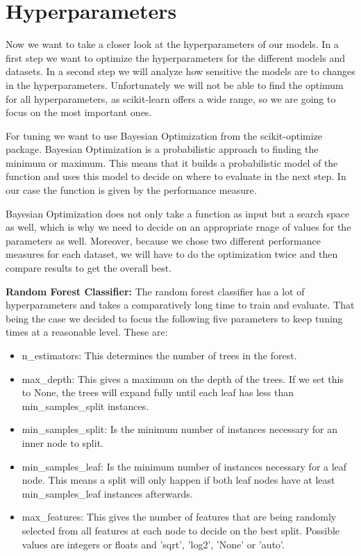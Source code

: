 \documentclass[a4paper,10pt]{article}
\begin{document}
\section{Hyperparameters}
\label{sec:hyperparameters}
Now we want to take a closer look at the hyperparameters of our models. In a first step we want to optimize the hyperparameters for the different models and datasets.
In a second step we will analyze how sensitive the models are to changes in the hyperparameters. Unfortunately we will not be able to find the optimum for all hyperparameters, as scikit-learn offers a wide range, so we are going to focus on the most important ones.

For tuning we want to use Bayesian Optimization from the scikit-optimize package. Bayesian Optimization is a probabilistic approach to finding the minimum or maximum. This means that it builds a probabilistic model of the function and uses this model to decide on where to evaluate in the next step. In our case the function is given by the performance measure. 

Bayesian Optimization does not only take a function as input but a search space as well, which is why we need to decide on an appropriate rnage of values for the parameters as well. Moreover, because we chose two different performance measures for each dataset, we will have to do the optimization twice and then compare results to get the overall best.

\textbf{Random Forest Classifier:} The random forest classifier has a lot of hyperparameters and takes a comparatively long time to train and evaluate. That being the case we decided to focus the following five parameters to keep tuning times at a reasonable level. These are:

\begin{itemize}
    \item \textsf{n\_estimators}: This determines the number of trees in the forest.
\item \textsf{max\_depth}: This gives a maximum on the depth of the trees. If we set this to None, the trees will expand fully until each leaf has less than \textsf{min\_samples\_split} instances.
\item \textsf{min\_samples\_split}: Is the minimum number of instances necessary for an inner node to split.
\item \textsf{min\_samples\_leaf}: Is the minimum number of instances necessary for a leaf node. This means a split will only happen if both leaf nodes have at least \textsf{min\_samples\_leaf} instances afterwards.
\item \textsf{max\_features}: This gives the number of features that are being randomly selected from all features at each node to decide on the best split. Possible values are integers or floats and 'sqrt', 'log2', 'None' or 'auto'.
\end{itemize}
\end{document}
